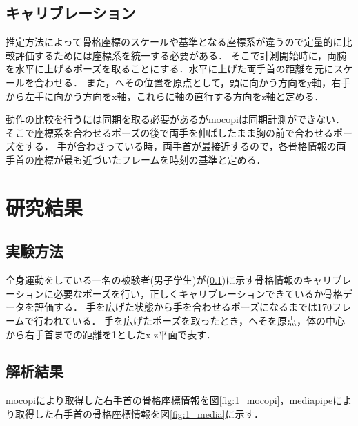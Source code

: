 \documentclass[titlepage]{jarticle}
\begin{document}
\subsection{キャリブレーション}\label{kyari}
推定方法によって骨格座標のスケールや基準となる座標系が違うので定量的に比較評価するためには座標系を統一する必要がある．
そこで計測開始時に，両腕を水平に上げるポーズを取ることにする．水平に上げた両手首の距離を元にスケールを合わせる．
また，へその位置を原点として，頭に向かう方向をy軸，右手から左手に向かう方向をx軸，これらに軸の直行する方向をz軸と定める．

動作の比較を行うには同期を取る必要があるがmocopiは同期計測ができない．
そこで座標系を合わせるポーズの後で両手を伸ばしたまま胸の前で合わせるポーズをする．
手が合わさっている時，両手首が最接近するので，各骨格情報の両手首の座標が最も近づいたフレームを時刻の基準と定める．


\section{研究結果}
\subsection{実験方法}
全身運動をしている一名の被験者(男子学生)が(\ref{kyari})に示す骨格情報のキャリブレーションに必要なポーズを行い，正しくキャリブレーションできているか骨格データを評価する．
手を広げた状態から手を合わせるポーズになるまでは170フレームで行われている．
手を広げたポーズを取ったとき，へそを原点，体の中心から右手首までの距離を1としたx-z平面で表す．
\subsection{解析結果}
mocopiにより取得した右手首の骨格座標情報を図\ref{fig:1_mocopi}，mediapipeにより取得した右手首の骨格座標情報を図\ref{fig:1_media}に示す．
\end{document}
